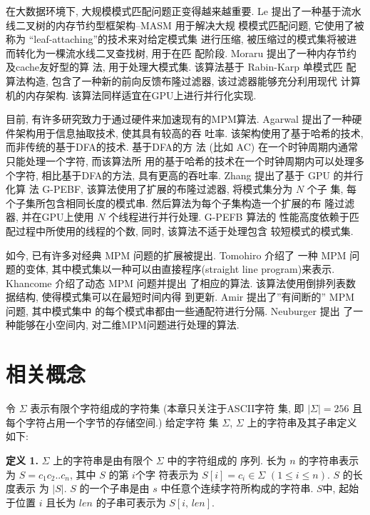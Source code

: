 在大数据环境下, 大规模模式匹配问题正变得越来越重要. Le \cite{Le2013}
提出了一种基于流水线二叉树的内存节约型框架构--\textsf{MASM} 用于解决大规
模模式匹配问题, 它使用了被称为 ``leaf-attaching''的技术来对给定模式集
进行压缩, 被压缩过的模式集将被进而转化为一棵流水线二叉查找树, 用于在匹
配阶段. Moraru \cite{Moraru2012} 提出了一种内存节约及cache友好型的算
法, 用于处理大模式集. 该算法基于 Rabin-Karp \cite{Karp1987} 单模式匹
配算法构造, 包含了一种新的前向反馈布隆过滤器, 该过滤器能够充分利用现代
计算机的内存架构. 该算法同样适宜在GPU上进行并行化实现.

目前, 有许多研究致力于通过硬件来加速现有的MPM算法. Agarwal
\cite{Agarwal2013} 提出了一种硬件架构用于信息抽取技术, 使其具有较高的吞
吐率. 该架构使用了基于哈希的技术, 而非传统的基于DFA的技术. 基于DFA的方
法 (比如 \textsf{AC}) 在一个时钟周期内通常只能处理一个字符, 而该算法所
用的基于哈希的技术在一个时钟周期内可以处理多个字符, 相比基于DFA的方法,
具有更高的吞吐率. Zhang \cite{Zhang2015} 提出了基于 GPU 的并行化算
法 \textsf{G-PEBF}, 该算法使用了扩展的布隆过滤器, 将模式集分为 $N$ 个子
集, 每个子集所包含相同长度的模式串. 然后算法为每个子集构造一个扩展的布
隆过滤器, 并在GPU上使用 $N$ 个线程进行并行处理. \textsf{G-PEFB} 算法的
性能高度依赖于匹配过程中所使用的线程的个数, 同时, 该算法不适于处理包含
较短模式的模式集.

如今, 已有许多对经典 MPM 问题的扩展被提出. Tomohiro \cite{I2015} 介绍了
一种 MPM 问题的变体, 其中模式集以一种可以由直接程序(straight line
program)来表示.  Khancome \cite{Khancome2013} 介绍了动态 MPM 问题并提出
了相应的算法. 该算法使用倒排列表数据结构, 使得模式集可以在最短时间内得
到更新. Amir \cite{Amir2015} 提出了''有间断的'' MPM 问题, 其中模式集中
的每个模式串都由一些通配符进行分隔. Neuburger \cite{Neuburger2012} 提出
了一种能够在小空间内, 对二维MPM问题进行处理的算法.

\section{相关概念}
\label{sec:notations}

令 $\Sigma$ 表示有限个字符组成的字符集 (本章只关注于ASCII字符
集, 即 $|\Sigma| = 256$ 且每个字符占用一个字节的存储空间.)  给定字符
集 $\Sigma$, $\Sigma$ 上的字符串及其子串定义如下:

\textbf{定义 1.}  $\Sigma$ 上的字符串是由有限个 $\Sigma$ 中的字符组成的
序列. 长为 $n$ 的字符串表示为 $S = c_1c_2..c_n$, 其中 $S$ 的第 $i$个字
符表示为 $S[i] = c_i \in \Sigma$ $(1 \leq i \leq n)$.  $S$ 的长度表示
为 $|S|$. $S$ 的一个子串是由 $s$ 中任意个连续字符所构成的字符串.  $S$中,
起始于位置 $i$ 且长为 $len$ 的子串可表示为 $S[i,\,len]$.

